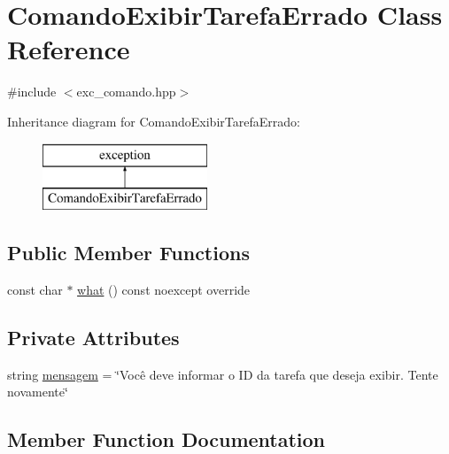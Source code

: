 \hypertarget{classComandoExibirTarefaErrado}{}\section{Comando\+Exibir\+Tarefa\+Errado Class Reference}
\label{classComandoExibirTarefaErrado}


{\ttfamily \#include $<$exc\+\_\+comando.\+hpp$>$}

Inheritance diagram for Comando\+Exibir\+Tarefa\+Errado\+:\begin{figure}[H]
\begin{center}
\leavevmode
\includegraphics[height=2.000000cm]{classComandoExibirTarefaErrado}
\end{center}
\end{figure}
\subsection*{Public Member Functions}
\begin{DoxyCompactItemize}
\item 
const char $\ast$ \hyperlink{classComandoExibirTarefaErrado_abb4fbf8c6ce9ac105ab15000712a39ed}{what} () const noexcept override
\end{DoxyCompactItemize}
\subsection*{Private Attributes}
\begin{DoxyCompactItemize}
\item 
string \hyperlink{classComandoExibirTarefaErrado_ae5e55f9c70c2f3a187b86ecc32ca27dd}{mensagem} = \char`\"{}Você deve informar o ID da tarefa que deseja exibir. Tente novamente\char`\"{}
\end{DoxyCompactItemize}


\subsection{Member Function Documentation}
\mbox{\label{classComandoExibirTarefaErrado_abb4fbf8c6ce9ac105ab15000712a39ed}} 
